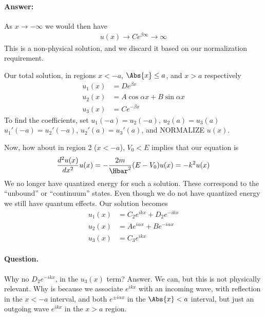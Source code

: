 {\paragraph{Answer:} As \(x \rightarrow -\infty\) we would then have
%
\begin{equation}\label{eqn:lecture9boundStates:280}
\begin{aligned}
u(x) \rightarrow C e^{\beta \infty} \rightarrow \infty
\end{aligned}
\end{equation}
%
This is a non-physical solution, and we discard it based on our normalization requirement.

Our total solution, in regions \(x < -a\), \(\Abs{x} \le a\), and \(x > a\) respectively
%
\begin{equation}\label{eqn:lecture9boundStates:300}
\begin{aligned}
u_1(x) &= D e^{\beta x} \\
u_2(x) &= A \cos\alpha x + B \sin\alpha x \\
u_3(x) &= C e^{-\beta x}
\end{aligned}
\end{equation}
%
To find the coefficients, set \(u_1(-a) = u_2(-a)\), \(u_2(a) = u_3(a)\) \(u_1'(-a) = u_2'(-a)\), \(u_2'(a) = u_3'(a)\), and NORMALIZE \(u(x)\).

Now, how about in region 2 (\(x < -a\)), \(V_0 < E\) implies that our equation is
%
\begin{equation}\label{eqn:PHY356Lecture9:40}
\begin{aligned}
\frac{d^2 u(x)}{dx^2} u(x) = - \frac{2m}{\Hbar^2} (E - V_0) u(x) = - k^2 u(x)
\end{aligned}
\end{equation}
%
We no longer have quantized energy for such a solution.  These correspond to the ``unbound'' or ``continuum'' states.  Even though we do not have quantized energy we still have quantum effects.  Our solution becomes
%
\begin{equation}\label{eqn:lecture9boundStates:320}
\begin{aligned}
u_1(x) &=
C_2 e^{i k x}
+D_2 e^{-i k x}  \\
u_2(x) &=
A e^{i \alpha x}
+B e^{-i \alpha x}  \\
u_3(x) &=
C_3 e^{i k x}
\end{aligned}
\end{equation}
%
\paragraph{Question.}  Why no \(D_2 e^{-i k x}\), in the \(u_3(x)\) term?
%
Answer.  We can, but this is not physically relevant.  Why is because we associate \(e^{ikx}\) with an incoming wave, with reflection in the \(x < -a\) interval, and both \(e^{\pm i \alpha x}\) in the \(\Abs{x} < a\) interval, but just an outgoing wave \(e^{i k x}\) in the \(x > a\) region.

}
